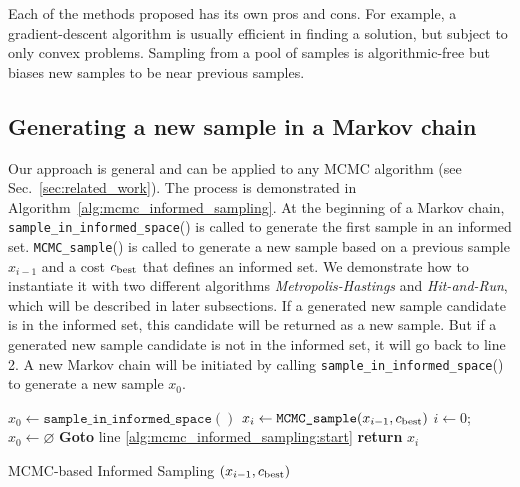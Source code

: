 \documentclass[letterpaper, 10 pt, conference]{ieeeconf}  %
\begin{document}
Each of the methods proposed has its own pros and cons.
For example, a gradient-descent algorithm is usually efficient in finding a solution, but subject to only convex problems.
Sampling from a pool of samples is algorithmic-free but biases new samples to be near previous samples.


\subsection{Generating a new sample in a Markov chain}
\label{mcmc}

Our approach is general and can be applied to any MCMC algorithm (see Sec.~\ref{sec:related_work}).
The process is demonstrated in Algorithm~\ref{alg:mcmc_informed_sampling}.
At the beginning of a Markov chain, \texttt{sample\_in\_informed\_space}() is called to generate the first sample in an informed set.
\texttt{MCMC\_sample}() is called to generate a new sample based on a previous sample $ x_{i-1} $ and a cost $ c_{\rm best} $ that defines an informed set.
We demonstrate how to instantiate it with two different algorithms \emph{Metropolis-Hastings} and \emph{Hit-and-Run}, which will be described in later subsections.
If a generated new sample candidate is in the informed set, this candidate will be returned as a new sample.
But if a generated new sample candidate is not in the informed set, it will go back to line 2.
A new Markov chain will be initiated by calling \texttt{sample\_in\_informed\_space}() to generate a new sample $ x_0 $.

\begin{algorithm}[t]
	\begin{algorithmic}[1]
		\LOOP 
		\label{alg:mcmc_informed_sampling:start}
			\STATE $x_{0} \leftarrow \texttt{sample\_in\_informed\_space}( )$
		\ENDIF
		\STATE $x_{i} \leftarrow \texttt{MCMC\_sample} (x_{i-1}, c_{\rm best})$ 
			\STATE $ i \leftarrow 0 $; $ x_{0} \leftarrow \varnothing $
			\STATE \textbf{Goto} line \ref{alg:mcmc_informed_sampling:start} 
		\ENDIF
		\STATE \textbf{return} $x_{i}$
		\ENDLOOP 
	\end{algorithmic}
	\caption{\captionstyle MCMC-based Informed Sampling $( x_{i-1}, c_{\rm best})$}
	\label{alg:mcmc_informed_sampling}	
\end{algorithm}
\end{document}
